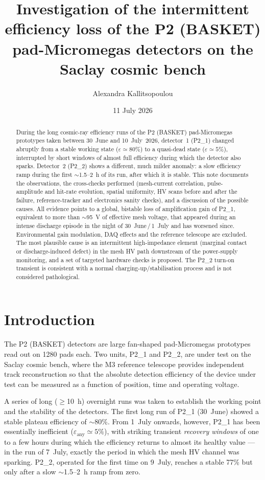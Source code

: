 \documentclass[11pt,a4paper]{article}
\title{Investigation of the intermittent efficiency loss of the P2 (BASKET)
pad-Micromegas detectors on the Saclay cosmic bench}
\author{Alexandra Kallitsopoulou}
\date{11 July 2026}
\newcommand{\detone}{P2\_1}
\newcommand{\dettwo}{P2\_2}
\begin{document}
\maketitle

\begin{abstract}
\noindent
During the long cosmic-ray efficiency runs of the P2 (BASKET) pad-Micromegas
prototypes taken between 30~June and 10~July~2026, detector~1 (\detone)
changed abruptly from a stable working state ($\varepsilon \simeq 80\%$) to a
quasi-dead state ($\varepsilon \simeq 5\%$), interrupted by short windows of
almost full efficiency during which the detector also sparks. Detector~2
(\dettwo) shows a different, much milder anomaly: a slow efficiency ramp
during the first $\sim$1.5--2~h of its run, after which it is stable.
This note documents the observations, the cross-checks performed
(mesh-current correlation, pulse-amplitude and hit-rate evolution, spatial
uniformity, HV scans before and after the failure, reference-tracker and
electronics sanity checks), and a discussion of the possible causes. All
evidence points to a global, bistable loss of amplification gain of \detone,
equivalent to more than $\sim$95~V of effective mesh voltage, that appeared
during an intense discharge episode in the night of 30~June\,/\,1~July and has
worsened since. Environmental gain modulation, DAQ effects and the reference
telescope are excluded. The most plausible cause is an intermittent
high-impedance element (marginal contact or discharge-induced defect) in the
mesh HV path downstream of the power-supply monitoring, and a set of targeted
hardware checks is proposed. The \dettwo{} turn-on transient is consistent
with a normal charging-up/stabilisation process and is not considered
pathological.
\end{abstract}

\section{Introduction}
\label{sec:intro}

The P2 (BASKET) detectors are large fan-shaped pad-Micromegas prototypes read
out on 1280 pads each. Two units, \detone{} and \dettwo, are under test on the
Saclay cosmic bench, where the M3 reference telescope provides independent
track reconstruction so that the absolute detection efficiency of the device
under test can be measured as a function of position, time and operating
voltage.

A series of long ($\geq$10~h) overnight runs was taken to establish the
working point and the stability of the detectors. The first long run of
\detone{} (30~June) showed a stable plateau efficiency of $\sim$80\%. From
1~July onwards, however, \detone{} has been essentially inefficient
($\varepsilon_{\text{any}}\simeq 5\%$), with striking transient
\emph{recovery windows} of one to a few hours during which the efficiency
returns to almost its healthy value --- in the run of 7~July, exactly the
period in which the mesh HV channel was sparking. \dettwo, operated for the
first time on 9~July, reaches a stable 77\% but only after a slow
$\sim$1.5--2~h ramp from zero.
\end{document}
